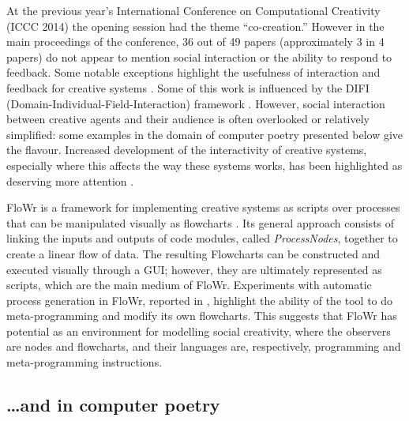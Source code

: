 At the previous year's International Conference on Computational Creativity (ICCC 2014) the opening session
had the theme ``co-creation.''  However in the main proceedings of the conference, 36 out of 49 papers
(approximately 3 in 4 papers) do not appear to mention social interaction or the ability to respond to feedback.
Some notable exceptions highlight the usefulness of interaction and feedback for creative systems \cite{mcgraw93,
colton00,  sosa09, perezyperez10MM, pease10, saunders12}. Some of this
work is influenced by the DIFI (Domain-Individual-Field-Interaction)
framework \cite{csik88}.  However, social interaction
between creative agents and their audience is often overlooked
or relatively simplified: some examples in the domain of computer poetry presented below give the flavour.
Increased development of the interactivity of creative systems, especially where this affects the way these systems works, has been highlighted as deserving more attention \cite{coltonwiggins12}.

FloWr is a framework for implementing creative systems as scripts over processes that can be manipulated visually as flowcharts \cite{charnley2014flowr}.  Its general approach consists of linking the inputs and outputs of code modules, called {\em ProcessNodes}, together to create a linear flow of data. The resulting Flowcharts can be constructed and executed visually through a GUI; however, they are ultimately represented as scripts, which are the main medium of FloWr. 
Experiments with automatic process generation in FloWr, reported in \cite{charnley2014flowr}, highlight the ability of the tool to do meta-programming and modify its own flowcharts. This suggests that FloWr has potential as an environment for modelling social creativity, where the observers are nodes and flowcharts, and their languages are, respectively, programming and meta-programming instructions.

\subsection{\ldots and in computer poetry}

